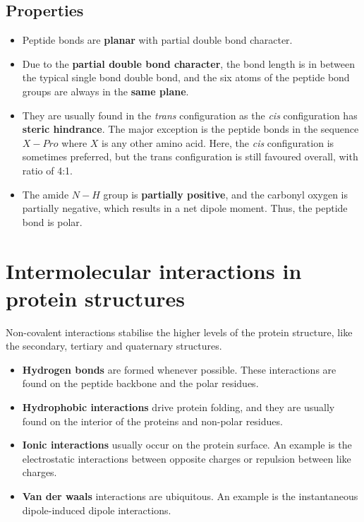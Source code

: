 \documentclass[11pt]{article}
\begin{document}
\subsection{Properties}
\label{sec:orgf7c7d6a}
\begin{itemize}
\item Peptide bonds are \textbf{planar} with partial double bond character.
\item Due to the \textbf{partial double bond character}, the bond length is in between the typical single bond double bond, and the six atoms of the peptide bond groups are always in the \textbf{same plane}.
\item They are usually found in the \emph{trans} configuration as the \emph{cis} configuration has \textbf{steric hindrance}. The major exception is the peptide bonds in the sequence \(X-Pro\) where \(X\) is any other amino acid. Here, the \emph{cis} configuration is sometimes preferred, but the trans configuration is still favoured overall, with ratio of 4:1.
\item The amide \(N-H\) group is \textbf{partially positive}, and the carbonyl oxygen is partially negative, which results in a net dipole moment. Thus, the peptide bond is polar.
\end{itemize}


\section{Intermolecular interactions in protein structures}
\label{sec:org1b731fd}
Non-covalent interactions stabilise the higher levels of the protein structure, like the secondary, tertiary and quaternary structures.

\begin{itemize}
\item \textbf{Hydrogen bonds} are formed whenever possible. These interactions are found on the peptide backbone and the polar residues.
\item \textbf{Hydrophobic interactions} drive protein folding, and they are usually found on the interior of the proteins and non-polar residues.
\item \textbf{Ionic interactions} usually occur on the protein surface. An example is the electrostatic interactions between opposite charges or repulsion between like charges.
\item \textbf{Van der waals} interactions are ubiquitous. An example is the instantaneous dipole-induced dipole interactions.
\end{itemize}
\end{document}
